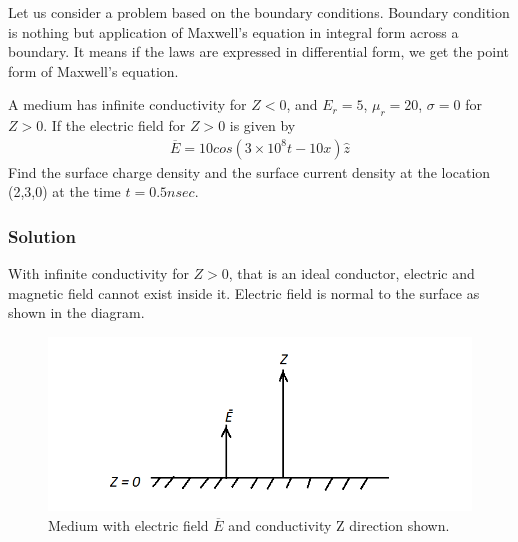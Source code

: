 Let us consider a problem based on the boundary conditions. Boundary condition is nothing but application of Maxwell's equation in integral form across a boundary. It means if the laws are expressed in differential form, we get the point form of Maxwell's equation.
\begin{exmp}
A medium has infinite conductivity for $Z<0$, and $E_r=5$, $\mu_r = 20$, $\sigma = 0$ for $Z>0$. If the electric field for $Z>0$ is given by 
\begin{align*}
\overline{E} = 10cos(3\times 10^8t - 10x)\hat{z}
\end{align*}
Find the surface charge density and the surface current density at the location (2,3,0) at the time $t = 0.5nsec$.\\
\subsubsection*{Solution}
With infinite conductivity for $Z>0$, that is an ideal conductor, electric and magnetic field cannot exist inside it. Electric field is normal to the surface as shown in the diagram.
\begin{figure}[h]
\centering
\includegraphics[width=1\linewidth]{./graphics/diemedium7}
\caption{Medium with electric field $\overline{E}$ and conductivity Z direction shown.}
\end{figure}


\end{exmp}
